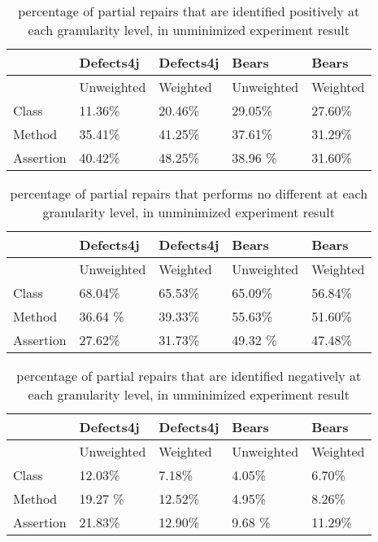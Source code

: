 \documentclass[sigconf, timestamp-false, anonymous=true]{acmart}
\begin{document}
    

\begin{table}
{\begin{center}
    \begin{tabular}{| l | l | l | l | l |} \hline
     & Defects4j & Defects4j & Bears & Bears  \\ \hline
     & Unweighted & Weighted &Unweighted& Weighted \\ \hline
    Class & 11.36\% & 20.46\% & 29.05\% & 27.60\%\\
    Method & 35.41\% & 41.25\% & 37.61\% & 31.29\% \\
    Assertion & 40.42\% & 48.25\% & 38.96 \% & 31.60\% \\
    \hline
    
    \end{tabular}
\end{center}}
\caption{percentage of partial repairs that are identified positively at each granularity level, in unminimized experiment result}
\end{table}

    
\begin{table}
{\begin{center}
    \begin{tabular}{| l | l | l | l | l |} \hline
     & Defects4j & Defects4j & Bears & Bears  \\ \hline
     & Unweighted & Weighted & Unweighted & Weighted \\ \hline
    Class & 68.04\% & 65.53\% & 65.09\% & 56.84\%\\
    Method & 36.64 \% & 39.33\% & 55.63\% & 51.60\% \\
    Assertion & 27.62\% & 31.73\% & 49.32 \% & 47.48\% \\
    \hline
    
    \end{tabular}
\end{center} }
\caption{percentage of partial repairs that performs no different at each granularity level, in unminimized experiment result}
\end{table}   
    
\begin{table}
{\begin{center}
    \begin{tabular}{| l | l | l | l | l |} \hline
     & Defects4j & Defects4j & Bears & Bears  \\ \hline
     & Unweighted & Weighted & Unweighted & Weighted \\ \hline
    Class & 12.03\% & 7.18\% & 4.05\% & 6.70\%\\
    Method & 19.27 \% & 12.52\% & 4.95\% & 8.26\% \\
    Assertion & 21.83\% & 12.90\% & 9.68 \% & 11.29\% \\
    \hline
    
    \end{tabular}
\end{center}}
\caption{percentage of partial repairs that are identified negatively at each granularity level, in unminimized experiment result}
\end{table}
    
\end{document}

